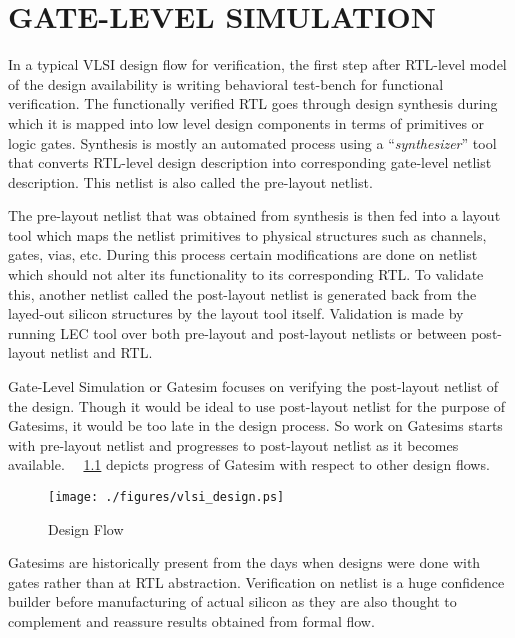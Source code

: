\chapter{GATE-LEVEL SIMULATION}
\label{chap:gate_intro.tex}

In a typical VLSI design flow for verification, the first step after RTL-level model of the design availability is writing behavioral test-bench for functional verification. The functionally verified RTL goes through design synthesis during which it is mapped into low level design components in terms of primitives or logic gates. Synthesis is mostly an automated process using a ``{\it synthesizer}'' tool that converts RTL-level design description into corresponding gate-level netlist description. This netlist is also called the pre-layout netlist.

The pre-layout netlist that was obtained from synthesis is then fed into a layout tool which maps the netlist primitives to physical structures such as channels, gates, vias, etc. During this process certain modifications are done on netlist which should not alter its functionality to its corresponding RTL. To validate this, another netlist called the post-layout netlist is generated back from the layed-out silicon structures by the layout tool itself. Validation is made by running LEC tool over both pre-layout and post-layout netlists or between post-layout netlist and RTL.

Gate-Level Simulation or Gatesim focuses on verifying the post-layout netlist of the design. Though it would be ideal to use post-layout netlist for the purpose of Gatesims, it would be too late in the design process. So work on Gatesims starts with pre-layout netlist and progresses to post-layout netlist as it becomes available. ~\figurename{~\ref{fig:vlsi_design.ps}} depicts progress of Gatesim with respect to other design flows.

\begin{figure}[h]
\centering
\texttt{[image: ./figures/vlsi\_design.ps]}
\caption{Design Flow}
\label{fig:vlsi_design.ps}
\end{figure}
Gatesims are historically present from the days when designs were done with gates rather than at RTL abstraction. Verification on netlist is a huge confidence builder before manufacturing of actual silicon as they are also thought to complement and reassure results obtained from formal flow.


